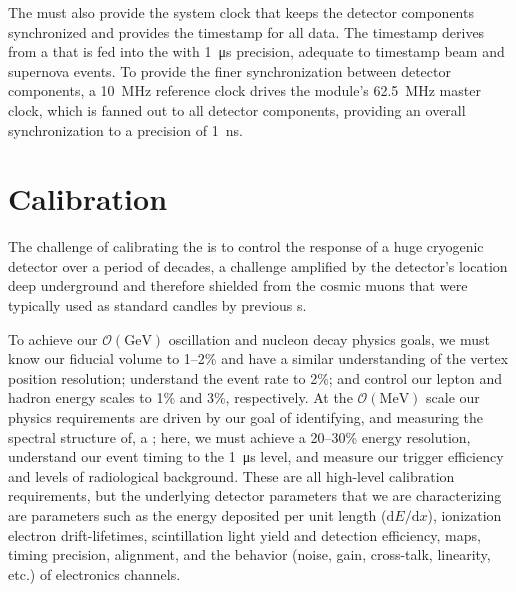 The  must also provide the system clock that keeps the detector components synchronized and provides the timestamp for all data. The timestamp derives from a   that is fed into the  with \SI{1}{\micro\second} precision, adequate to timestamp beam and supernova events. To provide the finer synchronization between detector components, a \SI{10}{\mega\hertz} reference clock drives the module's \SI{62.5}{\mega\hertz} master clock, which is fanned out to all detector components, providing an overall synchronization to a precision of \SI{1}{\nano\second}.

\section{Calibration}
\label{sec:fdsp-exec-calibration}

The challenge of calibrating the   is to control the response of a huge cryogenic detector over a period of decades, a challenge amplified by the detector's location deep underground and therefore shielded from the cosmic muons that were typically used as standard candles by previous s.

To achieve our $\mathcal{O}(\si{\giga\electronvolt})$ oscillation and nucleon decay physics goals, we must know our fiducial volume to 1--2\% and have a similar understanding of the vertex position resolution; understand the \nue event rate to 2\%; and control our lepton and hadron energy scales to 1\% and 3\%, respectively. At the $\mathcal{O}(\si{\mega\electronvolt})$ scale our physics requirements are driven by our goal of identifying, and measuring the spectral structure of, a ; here, we must achieve a 20--30\% energy resolution, understand our event timing to the \SI{1}{\micro\second} level, and measure our trigger efficiency and levels of radiological background. These are all high-level calibration requirements, but the underlying detector parameters that we are characterizing are parameters such as the energy deposited per unit length ($\mathrm{d}E/\mathrm{d}x$), ionization electron drift-lifetimes, scintillation light yield and detection efficiency, \efield maps, timing precision,  alignment, and the behavior (noise, gain, cross-talk, linearity, etc.) of electronics channels.

